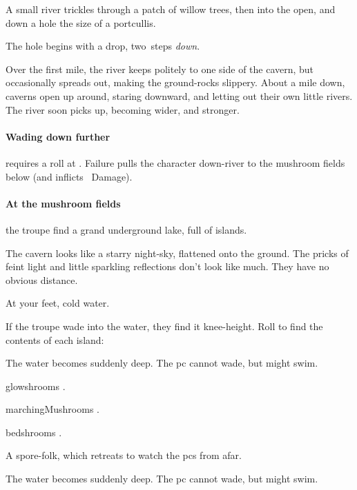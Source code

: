 \documentclass[10pt,twoside]{book}
\begin{document}
\begin{boxtext}
  A small river trickles through a patch of willow trees, then into the open, and down a hole the size of a portcullis.
\end{boxtext}

The hole begins with a drop, two~\glspl{step} \emph{down}.%

\begin{boxtext}
  Over the first mile, the river keeps politely to one side of the cavern, but occasionally spreads out, making the ground-rocks slippery.
  About a mile down, caverns open up around, staring downward, and letting out their own little rivers.
  The river soon picks up, becoming wider, and stronger.
\end{boxtext}

\paragraph{Wading down further}
requires a  roll at \tn[8].
Failure pulls the character down-river to the mushroom fields below (and inflicts ~Damage).

\paragraph{At the mushroom fields}
the troupe find a grand underground lake, full of islands.


\begin{boxtext}
  The cavern looks like a starry night-sky, flattened onto the ground.
  The pricks of feint light and little sparkling reflections don't look like much.
  They have no obvious distance.

  At your feet, cold water.
\end{boxtext}

If the troupe wade into the water, they find it knee-height.
Roll to find the contents of each island:

{
  \footnotesize
  \begin{dlist}
    \item
    The water becomes suddenly deep.
    The \gls{pc} cannot wade, but might swim.
    \item
    \Glspl{glowshroom} .
    \item
    \Glspl{marchingMushroom} .
    \item
    \Glspl{bedshroom} .
    \item
    A spore-folk, which retreats to watch the \glspl{pc} from afar.
    \item
    The water becomes suddenly deep.
    The \gls{pc} cannot wade, but might swim.
  \end{dlist}
}
\end{document}
